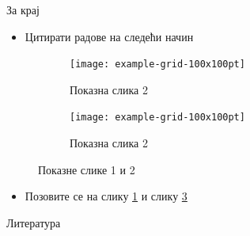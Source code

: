 \documentclass[aspectratio=169,10pt]{beamer}
\begin{document}
\begin{frame}{За крај}

\begin{itemize}
    \item Цитирати радове на следећи начин \cite{matze}
\end{itemize}


\begin{figure}[H]
\centering
\begin{subfigure}{.5\textwidth}
  \centering
  \texttt{[image: example-grid-100x100pt]}
  \caption{Показна слика 2}
  \label{fig:Pokazna1}
\end{subfigure}%
\begin{subfigure}{.5\textwidth}
  \centering
  \texttt{[image: example-grid-100x100pt]}
  \caption{Показна слика 2}
  \label{fig:Pokazna2}
\end{subfigure}
\caption{Показне слике 1 и 2}
\label{fig:PokazneSlike}
\end{figure}   

\begin{itemize}
    \item Позовите се на слику \ref{fig:Pokazna1} и слику \ref{fig:PokazneSlike} 
\end{itemize}

\end{frame}

\begin{frame}[allowframebreaks]{Литература}

  
  

\end{frame}
\end{document}
